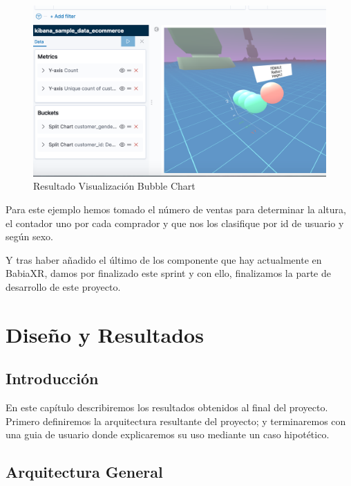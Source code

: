 \documentclass[a4paper, 12pt]{book}
\begin{document}
\begin{figure}[H]
  \centering
  \includegraphics[width=12cm, keepaspectratio]{img/development/bubbles-chart.png}
  \caption{Resultado Visualización Bubble Chart}
  \label{fig:bubblechart}
\end{figure}

Para este ejemplo hemos tomado el número de ventas para determinar la altura, el contador uno por cada comprador y que nos los clasifique por id de usuario y según sexo.

Y tras haber añadido el último de los componente que hay actualmente en BabiaXR, damos por finalizado este sprint y con ello, finalizamos la parte de desarrollo de este proyecto.




\cleardoublepage
\chapter{Diseño y Resultados}
\label{sec:resultados} 

\section{Introducción}
\label{sec:resultadointro}

En este capítulo describiremos los resultados obtenidos al final del proyecto. Primero definiremos la arquitectura resultante del proyecto; y terminaremos con una guia de usuario donde explicaremos su uso mediante un caso hipotético.

\section{Arquitectura General}
\label{sec:arquitectura}
\end{document}

